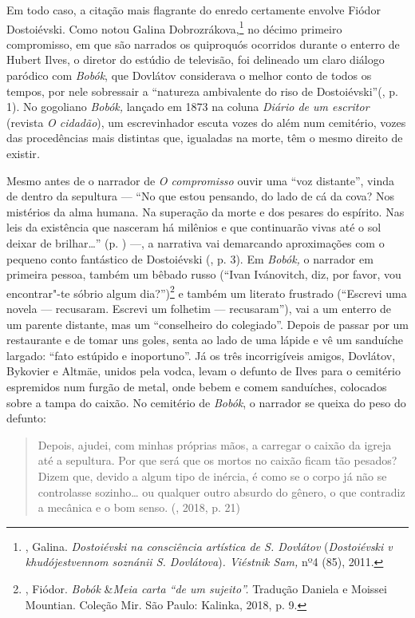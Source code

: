 Em todo caso, a citação mais flagrante do enredo certamente envolve
Fiódor Dostoiévski. Como notou Galina Dobrozrákova,\footnote{,
  Galina. \emph{Dostoiévski na consciência artística de S. Dovlátov}
  (\emph{Dostoiévski v khudójestvennom soznánii S. Dovlátova})\emph{.
  Viéstnik Sam,} nº4 (85), 2011.} no décimo primeiro
compromisso, em que são narrados os quiproquós ocorridos durante o
enterro de Hubert Ilves, o diretor do estúdio de televisão, foi
delineado um claro diálogo paródico com \emph{Bobók}, que Dovlátov
considerava o melhor conto de todos os tempos, por nele sobressair a
``natureza ambivalente do riso de Dostoiévski''(, p. 1). No
gogoliano \emph{Bobók,} lançado em 1873 na coluna \emph{Diário de um
escritor} (revista \emph{O cidadão}), um escrevinhador escuta
vozes do além num cemitério, vozes das procedências mais distintas que,
igualadas na morte, têm o mesmo direito de existir\emph{. }

Mesmo antes de o narrador de \emph{O compromisso} ouvir uma ``voz
distante'', vinda de dentro da sepultura --- ``No que estou pensando, do
lado de cá da cova? Nos mistérios da alma humana. Na superação da morte
e dos pesares do espírito. Nas leis da existência que nasceram há
milênios e que continuarão vivas até o sol deixar de brilhar\ldots{}'' (p. \pageref{ref6})
---, a narrativa vai demarcando aproximações com o pequeno conto
fantástico de Dostoiévski (, p. 3). Em \emph{Bobók,} o
narrador em primeira pessoa, também um bêbado russo (``Ivan Ivánovitch,
diz, por favor, vou encontrar"-te sóbrio algum dia?'')\footnote{,
  Fiódor. \emph{Bobók} \&\emph{Meia carta ``de um sujeito''.} Tradução
  Daniela e Moissei Mountian. Coleção Mir. São Paulo: Kalinka, 2018, p.
  9.} e também um literato frustrado (``Escrevi uma novela ---
recusaram. Escrevi um folhetim --- recusaram''), vai a um enterro de um
parente distante, mas um ``conselheiro do colegiado''. Depois de passar
por um restaurante e de tomar uns goles, senta ao lado de uma lápide e
vê um sanduíche largado: ``fato estúpido e inoportuno''. Já os três
incorrigíveis amigos, Dovlátov, Bykovier e Altmäe, unidos pela vodca,
levam o defunto de Ilves para o cemitério espremidos num furgão de
metal, onde bebem e comem sanduíches, colocados sobre a tampa do caixão.
No cemitério de \emph{Bobók}, o narrador se queixa do peso do defunto:

\begin{quote}
Depois, ajudei, com minhas próprias mãos, a carregar o caixão da igreja
até a sepultura. Por que será que os mortos no caixão ficam tão pesados?
Dizem que, devido a algum tipo de inércia, é como se o corpo já não se
controlasse sozinho\ldots{} ou qualquer outro absurdo do gênero, o que
contradiz a mecânica e o bom senso. (, 2018, p. 21)
\end{quote}

